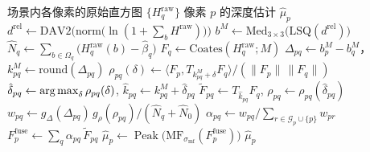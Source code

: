 \begin{algorithm}[!t]
\caption{单目引导的直方图融合测距（以像素 $p$ 为例）}
\label{alg:pipeline}
\begin{algorithmic}[1]
\small
\Require 场景内各像素的原始直方图 $\{H_q^{\mathrm{raw}}\}$
\Ensure 像素 $p$ 的深度估计 $\hat\mu_p$
\State $d^{\mathrm{rel}}\leftarrow\mathrm{DAV2}\Big(\mathrm{norm}\big(\ln(1+\sum_b H^{\mathrm{raw}})\big)\Big)$ 
\State $b^M\leftarrow\mathrm{Med}_{3\times3}\big(\mathrm{LSQ}(d^{\mathrm{rel}})\big)$ 
  \State $\hat N_q\leftarrow\sum_{b\in\Omega_q}\big(H_q^{\mathrm{raw}}(b)-\hat\beta_q\big)$ 
  \State $F_q\leftarrow\mathrm{Coates}(H_q^{\mathrm{raw}};M)$ 
\EndFor
{} 
  \State $\Delta_{pq}\leftarrow b_p^M-b_q^M$，\quad $k_{pq}^M\leftarrow\mathrm{round}(\Delta_{pq})$
    \State $\rho_{pq}(\delta)\leftarrow\big\langle F_p,T_{k_{pq}^M+\delta}F_q\big\rangle\big/(\|F_p\|\,\|F_q\|)$ 
  \EndFor
  \State $\hat\delta_{pq}\leftarrow\operatorname*{arg\,max}_\delta\rho_{pq}(\delta)$, \quad $\hat k_{pq}\leftarrow k_{pq}^M+\hat\delta_{pq}$
  \State $\widetilde F_{pq}\leftarrow T_{\hat k_{pq}}F_q$, \quad $\rho_{pq}\leftarrow\rho_{pq}(\hat\delta_{pq})$
  \State $w_{pq}\leftarrow g_\Delta(\Delta_{pq})\,g_\rho(\rho_{pq})\big/(\hat N_q+\hat N_0)$ 
\EndFor
\State $\alpha_{pq}\leftarrow w_{pq}\big/\sum_{r\in\mathcal{G}_p\cup\{p\}}w_{pr}$ 
\State $F_p^{\mathrm{fuse}}\leftarrow\sum_q\alpha_{pq}\,\widetilde F_{pq}$ 
\State $\hat\mu_p\leftarrow\operatorname{Peak}\big(\mathrm{MF}_{\sigma_{\mathrm{mf}}}(F_p^{\mathrm{fuse}})\big)$ 
\State \Return $\hat\mu_p$
\end{algorithmic}
\end{algorithm}
